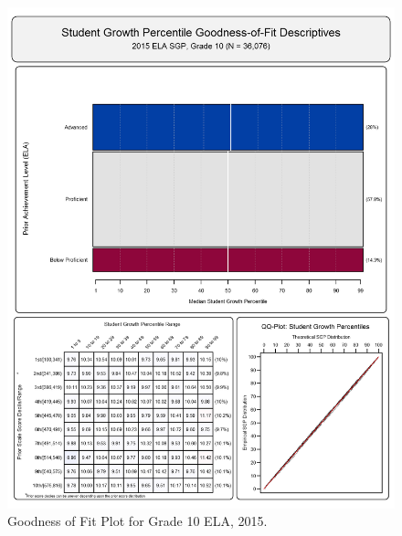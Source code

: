 \documentclass[12pt]{article}
\begin{document}
\begin{figure}[htbp]
\centering
\includegraphics{../img/Goodness_of_Fit/ELA.2015/2015_ELA_10;2014_ELA_9;2013_ELA_8;2012_ELA_7;2011_ELA_6;2010_ELA_5.png}
\caption{Goodness of Fit Plot for Grade 10 ELA, 2015.}
\end{figure}
\end{document}
